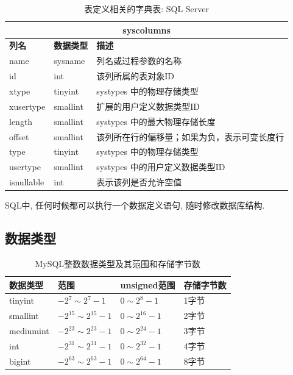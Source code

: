 \begin{table}[H]
\centering
\label{tab:syscolumns}
\begin{tabular}{|l|l|l|}
\hline
\multicolumn{3}{|c|}{syscolumns} \\ \hline
\textbf{列名} & \textbf{数据类型} & \textbf{描述} \\ \hline
name & sysname & 列名或过程参数的名称 \\ \hline
id & int & 该列所属的表对象ID \\ \hline
 xtype & tinyint & systypes 中的物理存储类型 \\ \hline
xusertype & smallint & 扩展的用户定义数据类型ID \\ \hline
length & smallint & systypes 中的最大物理存储长度 \\ \hline
offset & smallint & 该列所在行的偏移量；如果为负，表示可变长度行 \\ \hline
type & tinyint & systypes 中的物理存储类型 \\ \hline
usertype & smallint & systypes 中的用户定义数据类型ID \\ \hline
isnullable & int & 表示该列是否允许空值 \\ \hline
\end{tabular}
\caption{表定义相关的字典表: SQL Server}
\end{table}

SQL中, 任何时候都可以执行一个数据定义语句, 随时修改数据库结构.

\subsection{数据类型}

\begin{table}[H]
\centering
\label{tab:mysql_int_types}
\begin{tabular}{|l|l|l|l|}
\hline
\textbf{数据类型} & \textbf{范围} & \textbf{unsigned范围} & \textbf{存储字节数} \\ \hline
tinyint & $-2^7 \sim 2^7 - 1$ & $0 \sim 2^8 - 1$ & 1字节 \\ \hline
smallint & $-2^{15} \sim 2^{15} - 1$ & $0 \sim 2^{16} - 1$ & 2字节 \\ \hline
mediumint & $-2^{23} \sim 2^{23} - 1$ & $0 \sim 2^{24} - 1$ & 3字节 \\ \hline
int & $-2^{31} \sim 2^{31} - 1$ & $0 \sim 2^{32} - 1$ & 4字节 \\ \hline
bigint & $-2^{63} \sim 2^{63} - 1$ & $0 \sim 2^{64} - 1$ & 8字节 \\ \hline
\end{tabular}
\caption{MySQL整数数据类型及其范围和存储字节数}
\end{table}

